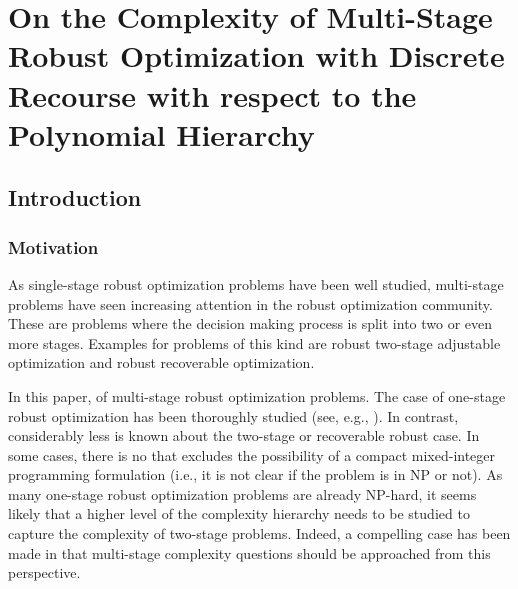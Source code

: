 







\chapter{On the Complexity of Multi-Stage Robust Optimization with Discrete Recourse with respect to the Polynomial Hierarchy}
\label{ch:multistage-complexity}

\section{Introduction}

\subsection{Motivation}

As single-stage robust optimization problems have been well studied, multi-stage problems have seen increasing attention in the robust optimization community. These are problems where the decision making process is split into two or even more stages. Examples for problems of this kind are robust two-stage adjustable optimization and robust recoverable optimization.

In this paper,  of multi-stage robust optimization problems. The case of one-stage robust optimization has been thoroughly studied (see, e.g., \cite{kasperski2016robust}). In contrast, considerably less is known about the two-stage or recoverable robust case. In some cases, there is no
that excludes the possibility of a compact mixed-integer programming formulation (i.e., it is not clear if the problem is in NP or not). As many one-stage robust optimization problems are already NP-hard, it seems likely that a higher level of the complexity hierarchy \cite{stockmeyer1976polynomial} needs to be studied to capture the complexity of two-stage problems. Indeed, a compelling case has been made in \cite{woeginger2021trouble} that multi-stage complexity questions should be approached from this perspective.

